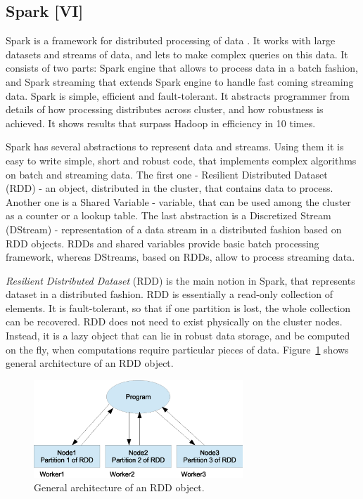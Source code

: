 \subsection{Spark [VI]}

Spark is a framework for distributed processing of data \cite{Zaharia2010, Zaharia2013, Spark1, Spark2}.
It works with large datasets and streams of data, and lets to make complex queries on this data.
It consists of two parts: Spark engine that allows to process data in a batch fashion, and Spark streaming that extends Spark engine to handle fast coming streaming data.
Spark is simple, efficient and fault-tolerant.
It abstracts programmer from details of how processing distributes across cluster, and how robustness is achieved.
It shows results that surpass Hadoop in efficiency in 10 times.

Spark has several abstractions to represent data and streams.
Using them it is easy to write simple, short and robust code, that implements complex algorithms on batch and streaming data.
The first one - Resilient Distributed Dataset (RDD) - an object, distributed in the cluster, that contains data to process.
Another one is a Shared Variable - variable, that can be used among the cluster as a counter or a lookup table.
The last abstraction is a Discretized Stream (DStream) - representation of a data stream in a distributed fashion based on RDD objects.
RDDs and shared variables provide basic batch processing framework, whereas DStreams, based on RDDs, allow to process streaming data.


\textit{Resilient Distributed Dataset}  (RDD) is the main notion in Spark, that represents dataset in a distributed fashion.
RDD is essentially a read-only collection of elements.
It is fault-tolerant, so that if one partition is lost, the whole collection can be recovered.
RDD does not need to exist physically on the cluster nodes.
Instead, it is a lazy object that can lie in robust data storage, and be computed on the fly, when computations require particular pieces of data.
Figure~\ref{fig:RDDArchitecture} shows general architecture of an RDD object.

\begin{figure}[h]
  \centering
  \includegraphics [width=0.7\textwidth]{images/RDDArchitecture}
  \caption{General architecture of an RDD object.}
  \label{fig:RDDArchitecture}
\end{figure}

